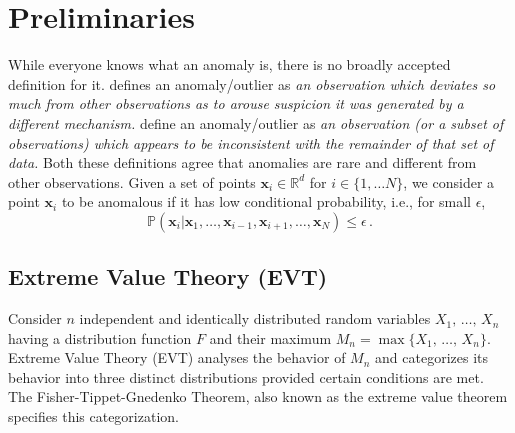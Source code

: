 \section{Preliminaries}\label{sec:prelim}
While everyone knows what an anomaly is, there is no broadly accepted definition for it. \citet{hawkins1980identification} defines an anomaly/outlier as \textit{an observation which deviates so much from other observations as to arouse suspicion it was  generated by a different mechanism.} \citet{barnett1994outliers} define an anomaly/outlier as \textit{an observation (or a subset of observations) which appears to be inconsistent with the remainder of that set of data.} Both these definitions agree that anomalies are rare and different from other observations. Given a set of points $\bm{x}_{i} \in \mathbb{R}^d$ for $i \in \{1, \ldots N\}$, we consider a point $\bm{x}_i$ to be anomalous if it has low conditional probability, i.e., for small $\epsilon$,
\begin{equation}
    \mathbb{P}(\bm{x}_{i}|\bm{x}_{1}, \ldots, \bm{x}_{i-1}, \bm{x}_{i+1}, \ldots, \bm{x}_{N}) \leq \epsilon \, . 
\end{equation}

\subsection{Extreme Value Theory (EVT)}
Consider $n$ independent and identically distributed random variables $X_1, \, \ldots, \,  X_n$ having a distribution function $F$ and their maximum $  M_n = \max \{X_1, \, \ldots, \, X_n\} $. Extreme Value Theory (EVT) analyses the behavior of $M_n$ and categorizes its behavior into three distinct distributions provided certain conditions are met. The Fisher-Tippet-Gnedenko Theorem, also known as the extreme value theorem specifies this categorization. 


